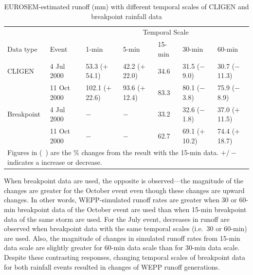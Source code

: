\begin{table}[htbp]
  \centering
  \footnotesize
  \caption[EUROSEM-estimated runoff (mm) with different temporal scales of
CLIGEN and breakpoint rainfall data]{EUROSEM-estimated runoff (mm) with
different temporal scales of CLIGEN and breakpoint rainfall data}
\label{tab:DifferentTemporalScalesOfRainfallDataOnEUROSEMRunoffEstimation}
    \begin{tabular}{lllllll}
      \toprule
      & & \multicolumn{5}{c}{Temporal Scale}\\
      \cmidrule{3-7}
      Data type & Event & 1-min & 5-min & 15-min & 30-min & 60-min \\
      \midrule
      CLIGEN & 4 Jul 2000 & 53.3 ($+$54.1) & 42.2 ($+$22.0) & 34.6 & 31.5
($-$9.0) & 30.7 ($-$11.3) \\
       & 11 Oct 2000 & 102.1 ($+$22.6) & 93.6 ($+$12.4) & 83.3 & 80.1 ($-$3.8) &
75.9 ($-$8.9) \\
       \midrule
      Breakpoint & 4 Jul 2000 & $-$ & $-$ & 33.2 & 32.6 ($-$1.8) & 37.0
($+$11.5) \\
       & 11 Oct 2000 & $-$ & $-$ & 62.7 & 69.1 ($+$10.2) & 74.4 ($+$18.7)\\
      \bottomrule
      \multicolumn{7}{p{12cm}}{\footnotesize Figures in (\ ) are the \% changes
from the result with the 15-min data. $+/-$ indicates a increase or decrease.}\\
    \end{tabular}
\end{table}

When breakpoint data are used, the opposite is observed---the magnitude of the
changes are greater for the October event even though these changes are upward
changes. In other words, WEPP-simulated runoff rates are greater when 30 or
60-min breakpoint data of the October event are used than when 15-min
breakpoint data of the same storm are used. For the July event, decreases in
runoff are observed when breakpoint data with the same temporal scales (i.e.\
30 or 60-min) are used. Also, the magnitude of changes in simulated runoff
rates from 15-min data scale are slightly greater for 60-min data scale than for
30-min data scale. Despite these contrasting responses, changing temporal scales
of breakpoint data for both rainfall events resulted in changes of WEPP runoff
generations.

